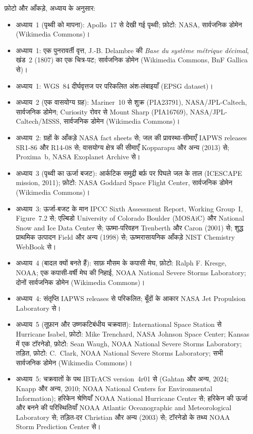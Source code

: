 \bigskip
\noindent फ़ोटो और आँकड़े, अध्याय के अनुसार:
\begin{itemize}\small\setlength{\emergencystretch}{2em}
  \item अध्याय~1 (पृथ्वी को मापना): Apollo~17 से देखी गई पृथ्वी; फ़ोटो: NASA, सार्वजनिक डोमेन (Wikimedia Commons)।
  \item अध्याय~1: एक पुनरावर्ती वृत्त, J.-B. Delambre की \emph{Base du système métrique décimal}, खंड~2 (1807) का एक चित्र-पट; सार्वजनिक डोमेन (Wikimedia Commons, BnF Gallica से)।
  \item अध्याय~1: WGS~84 दीर्घवृत्तज पर परिकलित अंश-लंबाइयाँ (EPSG dataset)।
  \item अध्याय~2 (एक वासयोग्य ग्रह): Mariner~10 से शुक्र (PIA23791), NASA/JPL-Caltech, सार्वजनिक डोमेन; Curiosity रोवर से Mount Sharp (PIA16769), NASA/JPL-Caltech/MSSS, सार्वजनिक डोमेन (Wikimedia Commons)।
  \item अध्याय~2: ग्रहों के आँकड़े NASA fact sheets से; जल की प्रावस्था-सीमाएँ IAPWS releases SR1-86 और R14-08 से; वासयोग्य क्षेत्र की सीमाएँ Kopparapu और अन्य (2013) से; Proxima~b, NASA Exoplanet Archive से।
  \item अध्याय~3 (पृथ्वी का ऊर्जा बजट): आर्कटिक समुद्री बर्फ़ पर पिघले जल के ताल (ICESCAPE mission, 2011); फ़ोटो: NASA Goddard Space Flight Center, सार्वजनिक डोमेन (Wikimedia Commons)।
  \item अध्याय~3: ऊर्जा-बजट के मान IPCC Sixth Assessment Report, Working Group~I, Figure~7.2 से; एल्बिडो University of Colorado Boulder (MOSAiC) और National Snow and Ice Data Center से; ऊष्मा-परिवहन Trenberth और Caron (2001) से; शुद्ध प्राथमिक उत्पादन Field और अन्य (1998) से; ऊष्मरासायनिक आँकड़े NIST Chemistry WebBook से।
  \item अध्याय~4 (बादल क्यों बनते हैं): साफ़ मौसम के कपासी मेघ, फ़ोटो: Ralph F. Kresge, NOAA; एक कपासी-वर्षी मेघ की निहाई, NOAA National Severe Storms Laboratory; दोनों सार्वजनिक डोमेन (Wikimedia Commons)।
  \item अध्याय~4: संतृप्ति IAPWS releases से परिकलित; बूँदों के आकार NASA Jet Propulsion Laboratory से।
  \item अध्याय~5 (तूफ़ान और उष्णकटिबंधीय चक्रवात): International Space Station से Hurricane Isabel, फ़ोटो: Mike Trenchard, NASA Johnson Space Center; Kansas में एक टॉरनेडो, फ़ोटो: Sean Waugh, NOAA National Severe Storms Laboratory; तड़ित, फ़ोटो: C.~Clark, NOAA National Severe Storms Laboratory; सभी सार्वजनिक डोमेन (Wikimedia Commons)।
  \item अध्याय~5: चक्रवातों के पथ IBTrACS version~4r01 से (Gahtan और अन्य, 2024; Knapp और अन्य, 2010; NOAA National Centers for Environmental Information); हरिकेन श्रेणियाँ NOAA National Hurricane Center से; हरिकेन की ऊर्जा और बनने की परिस्थितियाँ NOAA Atlantic Oceanographic and Meteorological Laboratory से; तड़ित-दर Christian और अन्य (2003) से; टॉरनेडो के तथ्य NOAA Storm Prediction Center से।

\end{itemize}
